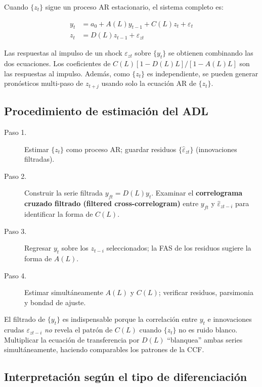 \documentclass[12pt]{article}
\begin{document}
Cuando $\{z_t\}$ sigue un proceso AR estacionario, el sistema completo es:

\begin{align}
y_t &= a_0 + A(L)y_{t-1} + C(L)z_t + \varepsilon_t \\
z_t &= D(L)z_{t-1} + \varepsilon_{zt}
\end{align}

\begin{intuicionmat}
Las respuestas al impulso de un shock $\varepsilon_{zt}$ sobre $\{y_t\}$ se obtienen combinando las dos ecuaciones. Los coeficientes de $C(L)[1-D(L)L]/[1-A(L)L]$ son las respuestas al impulso. Adem\'as, como $\{z_t\}$ es independiente, se pueden generar pron\'osticos multi-paso de $z_{t+j}$ usando solo la ecuaci\'on AR de $\{z_t\}$.
\end{intuicionmat}

\subsection{Procedimiento de estimaci\'on del ADL}

\begin{description}
  \item[Paso 1.] Estimar $\{z_t\}$ como proceso AR; guardar residuos $\{\hat{\varepsilon}_{zt}\}$ (innovaciones filtradas).
  \item[Paso 2.] Construir la serie filtrada $y_{ft} = D(L)y_t$. Examinar el \textbf{correlograma cruzado filtrado (filtered cross-correlogram)} entre $y_{ft}$ y $\hat{\varepsilon}_{zt-i}$ para identificar la forma de $C(L)$.
  \item[Paso 3.] Regresar $y_t$ sobre los $z_{t-i}$ seleccionados; la FAS de los residuos sugiere la forma de $A(L)$.
  \item[Paso 4.] Estimar simult\'aneamente $A(L)$ y $C(L)$; verificar residuos, parsimonia y bondad de ajuste.
\end{description}

\begin{intuicion}
El filtrado de $\{y_t\}$ es indispensable porque la correlaci\'on entre $y_t$ e innovaciones crudas $\varepsilon_{zt-i}$ \textit{no} revela el patr\'on de $C(L)$ cuando $\{z_t\}$ no es ruido blanco. Multiplicar la ecuaci\'on de transferencia por $D(L)$ ``blanquea'' ambas series simult\'aneamente, haciendo comparables los patrones de la CCF.
\end{intuicion}

\subsection{Interpretaci\'on seg\'un el tipo de diferenciaci\'on}
\end{document}
